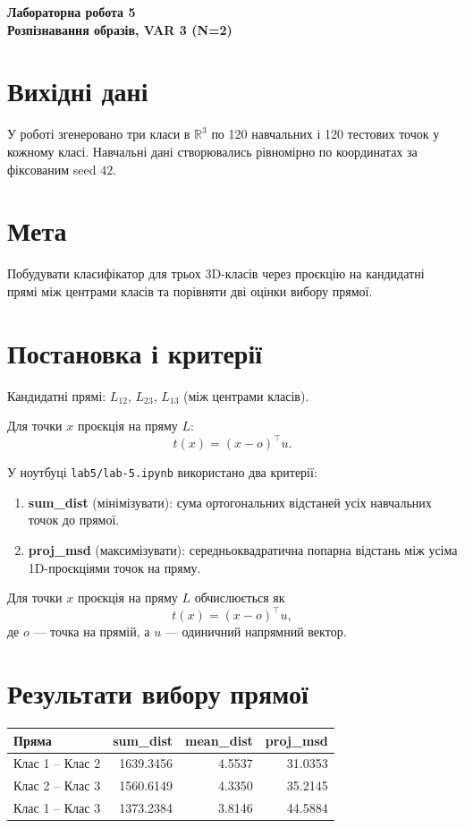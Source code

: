 \documentclass[12pt,a4paper]{article}
\begin{document}
\begin{center}
{\Large \textbf{Лабораторна робота 5}}\\[0.2cm]
\textbf{Розпізнавання образів, VAR 3 (N=2)}
\end{center}

\section*{Вихідні дані}
У роботі згенеровано три класи в $\mathbb{R}^3$ по 120 навчальних і 120 тестових точок у кожному класі.
Навчальні дані створювались рівномірно по координатах за фіксованим seed $42$.

\section*{Мета}
Побудувати класифікатор для трьох 3D-класів через проєкцію на кандидатні прямі між центрами класів та порівняти дві оцінки вибору прямої.

\section*{Постановка і критерії}
Кандидатні прямі: $L_{12}$, $L_{23}$, $L_{13}$ (між центрами класів).

Для точки $x$ проєкція на пряму $L$:
\[
t(x)=(x-o)^\top u.
\]

У ноутбуці \texttt{lab5/lab-5.ipynb} використано два критерії:
\begin{enumerate}
    \item \textbf{sum\_dist} (мінімізувати): сума ортогональних відстаней усіх навчальних точок до прямої.
    \item \textbf{proj\_msd} (максимізувати): середньоквадратична попарна відстань між усіма 1D-проєкціями точок на пряму.
\end{enumerate}

Для точки $x$ проєкція на пряму $L$ обчислюється як
\[
t(x)=(x-o)^\top u,
\]
де $o$ --- точка на прямій, а $u$ --- одиничний напрямний вектор.

\section*{Результати вибору прямої}
\begin{table}[H]
\centering
\begin{tabular}{lrrr}
\toprule
\textbf{Пряма} & \textbf{sum\_dist} & \textbf{mean\_dist} & \textbf{proj\_msd} \\
\midrule
Клас 1 -- Клас 2 & 1639.3456 & 4.5537 & 31.0353 \\
Клас 2 -- Клас 3 & 1560.6149 & 4.3350 & 35.2145 \\
Клас 1 -- Клас 3 & 1373.2384 & 3.8146 & 44.5884 \\
\bottomrule
\end{tabular}
\end{table}
\end{document}
